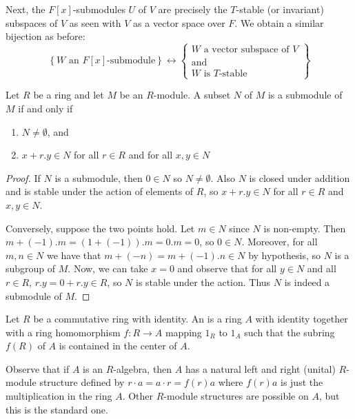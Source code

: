 \begin{eg}[(F{[x]}-modules)]
    Next, the $F[x]$-submodules $U$ of $V$ are precisely the $T$-stable (or invariant) subspaces of $V$ as seen with $V$ as a vector space over $F$. We obtain a similar bijection as before: \begin{equation*}
        \left\{W\text{ an }F[x]\text{-submodule}\right\} \leftrightarrow \left\{\begin{array}{c} W\text{ a vector subspace of } V \\ \text{and} \\ W\text{ is $T$-stable}\end{array}\right\}
    \end{equation*}
\end{eg}


\begin{prop}
    Let $R$ be a ring and let $M$ be an $R$-module. A subset $N$ of $M$ is a submodule of $M$ if and only if \begin{enumerate}
        \item $N \neq \emptyset$, and 
        \item $x+r.y \in N$ for all $r \in R$ and for all $x,y \in N$
    \end{enumerate}
\end{prop}
\begin{proof}
    If $N$ is a submodule, then $0 \in N$ so $N \neq \emptyset$. Also $N$ is closed under addition and is stable under the action of elements of $R$, so $x+r.y \in N$ for all $r \in R$ and $x,y \in N$.

    Conversely, suppose the two points hold. Let $m \in N$ since $N$ is non-empty. Then $m+(-1).m = (1+(-1)).m = 0.m = 0$, so $0 \in N$. Moreover, for all $m,n \in N$ we have that $m+(-n) = m+(-1).n \in N$ by hypothesis, so $N$ is a subgroup of $M$. Now, we can take $x = 0$ and observe that for all $y \in N$ and all $r \in R$, $r.y = 0+r.y \in R$, so $N$ is stable under the action. Thus $N$ is indeed a submodule of $M$.
\end{proof}


\begin{defn}
    Let $R$ be a commutative ring with identity. An  is a ring $A$ with identity together with a ring homomorphism $f:R\rightarrow A$ mapping $1_R$ to $1_A$ such that the subring $f(R)$ of $A$ is contained in the center of $A$.
\end{defn}

Observe that if $A$ is an $R$-algebra, then $A$ has a natural left and right (unital) $R$-module structure defined by $r\cdot a = a\cdot r = f(r)a$ where $f(r)a$ is just the multiplication in the ring $A$. Other $R$-module structures are possible on $A$, but this is the standard one.


